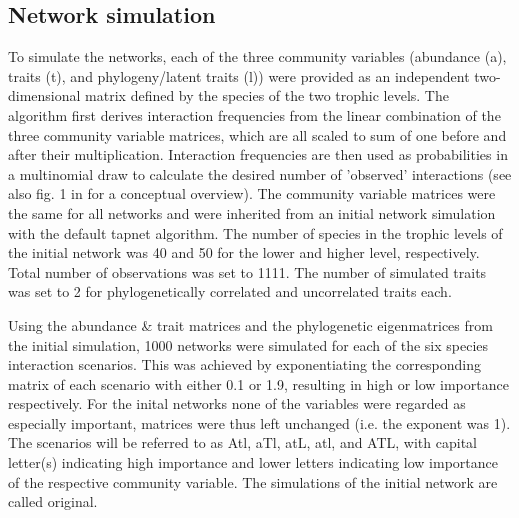 \documentclass[12pt,a4paper]{article}
\begin{document}

	\subsection{Network simulation} \label{sec:net_sim}
To simulate the networks, each of the three community variables (abundance (a), traits (t), and phylogeny/latent traits (l)) were provided as an independent two-dimensional matrix defined by the species of the two trophic levels. The algorithm first derives interaction frequencies from the linear combination of the three community variable matrices, which are all scaled to sum of one before and after their multiplication. Interaction frequencies are then used as probabilities in a multinomial draw to calculate the desired number of 'observed' interactions (see also fig. 1 in \cite{Benadi} for a conceptual overview).	 The community variable matrices were the same for all networks and were inherited from an initial network simulation with the default tapnet algorithm. The number of species in the trophic levels of the initial network was 40 and 50 for the lower and higher level, respectively. Total number of observations was set to 1111. The number of simulated traits was set to 2 for phylogenetically correlated and uncorrelated traits each.\par
	

	Using the abundance \& trait matrices and the phylogenetic eigenmatrices from the initial simulation, 1000 networks were simulated for each of the six species interaction scenarios. This was achieved by exponentiating the corresponding matrix of each scenario with either 0.1 or 1.9, resulting in high or low importance respectively. For the inital networks none of the variables were regarded as especially important, matrices were thus left unchanged (i.e. the exponent was 1). The scenarios will be referred to as Atl, aTl, atL, atl, and ATL, with capital letter(s) indicating high importance and lower letters indicating low importance of the respective community variable. The simulations of the initial network are called original.\par
	
\end{document}
